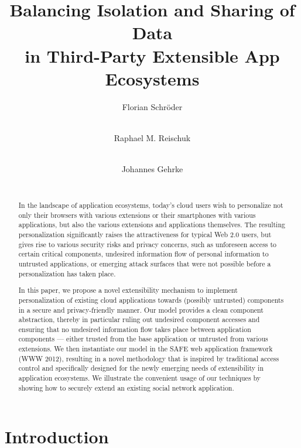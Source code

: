 \documentclass{src/acm_proc_article-sp} \else
\title{Balancing Isolation and Sharing of Data \\ in Third-Party Extensible App Ecosystems}
\author{
  \ifacm\alignauthor\fi
    Florian Schr\"oder
    \ifacm
      \\
      \affaddr{Saarland University}\\
      \affaddr{Germany}
    \else
      \inst{1}
    \fi
  \and
  \ifacm\alignauthor\fi
    Raphael M. Reischuk
    \ifacm
      \\
      \affaddr{ETH Z\"urich}\\
      \affaddr{Switzerland}
    \else
      \inst{2}
    \fi
  \and
  \ifacm\alignauthor\fi
    Johannes Gehrke
    \ifacm
      \\
      \affaddr{Cornell University}\\
      \affaddr{Ithaca, NY}
    \else
      \inst{3}
    \fi
}
\institute{Saarland University, Germany \and ETH Zurich, Switzerland \and Cornell University, USA}
\begin{document}
\setlength{\abovedisplayskip}{1pt}
\setlength{\belowdisplayskip}{1pt}
\setlength{\abovedisplayshortskip}{1pt}
\setlength{\belowdisplayshortskip}{1pt}

\maketitle

  \begin{abstract}

In the landscape of application ecosystems, today's cloud
users wish to personalize not only their browsers with
various extensions or their smartphones with various
applications, but also the various extensions and
applications themselves.
The resulting personalization significantly raises the attractiveness for typical Web 2.0 users, but gives rise to various security risks and privacy concerns, such as unforeseen access to certain critical components, undesired information flow of personal information to untrusted applications, or emerging attack surfaces
that were not possible before a personalization has taken place.


In this paper, we propose a novel extensibility mechanism to implement
personalization of existing cloud applications towards (possibly untrusted)
components in a secure and privacy-friendly manner. Our model provides a clean
component abstraction, thereby in particular ruling out undesired component
accesses and ensuring that no undesired information flow takes place between
application components --- either trusted from the base application or
untrusted from various extensions. We then instantiate our model in the SAFE
web application framework (WWW 2012), resulting in a novel methodology that is
inspired by traditional access control and specifically designed for the newly
emerging needs of extensibility in application ecosystems. We illustrate the
convenient usage of our techniques by showing how to securely extend an
existing social network application.

\end{abstract}

   \section{Introduction}
\end{document}
